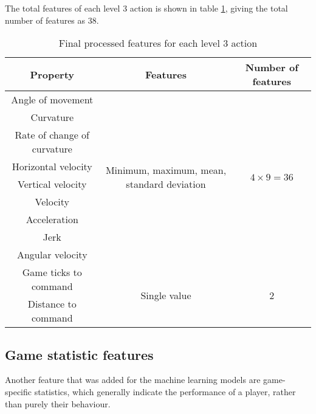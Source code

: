 \documentclass[Report.tex]{subfiles}
\begin{document}
The total features of each level 3 action is shown in table \ref{tbl-level3features}, giving the total number of features as 38. 
\begin{table}[H]
\renewcommand*{\arraystretch}{1.5}
\centering
\begin{tabular}{| c | c | c |}
\hline
\textbf{Property} & \textbf{Features} & \textbf{Number of features} \\ \hline
Angle of movement & \multirow{9}{6cm}{Minimum, maximum, mean, standard deviation} & \multirow{9}{*}{$4 \times 9  = 36$} \\ \cline{1-1}
Curvature & & \\ \cline{1-1}
Rate of change of curvature & & \\ \cline{1-1}
Horizontal velocity & & \\ \cline{1-1}
Vertical velocity & & \\ \cline{1-1}
Velocity & & \\ \cline{1-1}
Acceleration & & \\ \cline{1-1}
Jerk & & \\ \cline{1-1}
Angular velocity & & \\ \hline
Game ticks to command & \multirow{2}{*}{Single value} & \multirow{2}{*}{2} \\ \cline{1-1}
Distance to command & & \\ \hline
\end{tabular}
\caption{Final processed features for each level 3 action}
\label{tbl-level3features}
\end{table}

\subsection{Game statistic features}
Another feature that was added for the machine learning models are game-specific statistics, which generally indicate the performance of a player, rather than purely their behaviour. 
\end{document}
